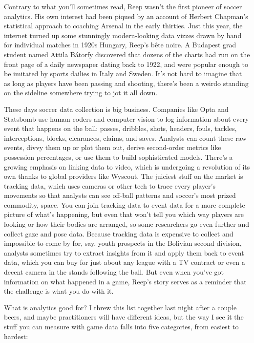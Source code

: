 Contrary to what you’ll sometimes read, Reep wasn’t the first pioneer of soccer analytics. His own interest had been piqued by an account of Herbert Chapman’s statistical approach to coaching Arsenal in the early thirties. Just this year, the internet turned up some stunningly modern-looking data vizzes drawn by hand for individual matches in 1920s Hungary, Reep’s bête noire. A Budapest grad student named Attila Bátorfy discovered that dozens of the charts had run on the front page of a daily newspaper dating back to 1922, and were popular enough to be imitated by sports dailies in Italy and Sweden. It’s not hard to imagine that as long as players have been passing and shooting, there’s been a weirdo standing on the sideline somewhere trying to jot it all down.

These days soccer data collection is big business. Companies like Opta and Statsbomb use human coders and computer vision to log information about every event that happens on the ball: passes, dribbles, shots, headers, fouls, tackles, interceptions, blocks, clearances, claims, and saves. Analysts can count these raw events, divvy them up or plot them out, derive second-order metrics like possession percentages, or use them to build sophisticated models. There’s a growing emphasis on linking data to video, which is undergoing a revolution of its own thanks to global providers like Wyscout. The juiciest stuff on the market is tracking data, which uses cameras or other tech to trace every player’s movements so that analysts can see off-ball patterns and soccer’s most prized commodity, space. You can join tracking data to event data for a more complete picture of what’s happening, but even that won’t tell you which way players are looking or how their bodies are arranged, so some researchers go even further and collect gaze and pose data. Because tracking data is expensive to collect and impossible to come by for, say, youth prospects in the Bolivian second division, analysts sometimes try to extract insights from it and apply them back to event data, which you can buy for just about any league with a TV contract or even a decent camera in the stands following the ball. But even when you’ve got information on what happened in a game, Reep’s story serves as a reminder that the challenge is what you do with it.

What is analytics good for?
I threw this list together last night after a couple beers, and maybe practitioners will have different ideas, but the way I see it the stuff you can measure with game data falls into five categories, from easiest to hardest:

